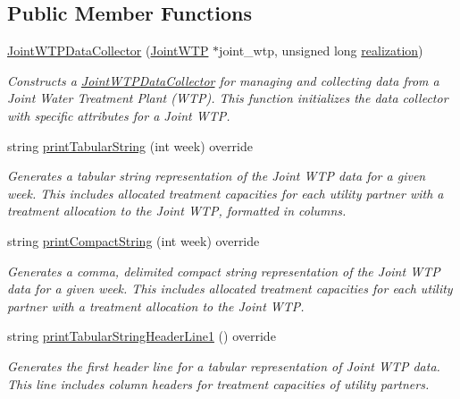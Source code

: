 \subsection*{Public Member Functions}
\begin{DoxyCompactItemize}
\item 
\mbox{\hyperlink{classJointWTPDataCollector_adcff7bd94e8f81a848b073d3a17c29ee}{Joint\+W\+T\+P\+Data\+Collector}} (\mbox{\hyperlink{classJointWTP}{Joint\+W\+TP}} $\ast$joint\+\_\+wtp, unsigned long \mbox{\hyperlink{classDataCollector_a9ef2887466fe3123aa19ef956a219b96}{realization}})
\begin{DoxyCompactList}\small\item\em Constructs a \mbox{\hyperlink{classJointWTPDataCollector}{Joint\+W\+T\+P\+Data\+Collector}} for managing and collecting data from a Joint Water Treatment Plant (W\+TP). This function initializes the data collector with specific attributes for a Joint W\+TP. \end{DoxyCompactList}\item 
string \mbox{\hyperlink{classJointWTPDataCollector_a9159c0e5c58ceb8b9bf86f01b53ecdef}{print\+Tabular\+String}} (int week) override
\begin{DoxyCompactList}\small\item\em Generates a tabular string representation of the Joint W\+TP data for a given week. This includes allocated treatment capacities for each utility partner with a treatment allocation to the Joint W\+TP, formatted in columns. \end{DoxyCompactList}\item 
string \mbox{\hyperlink{classJointWTPDataCollector_aadb9fb969b265c72555bb5a7d3ed945d}{print\+Compact\+String}} (int week) override
\begin{DoxyCompactList}\small\item\em Generates a comma, delimited compact string representation of the Joint W\+TP data for a given week. This includes allocated treatment capacities for each utility partner with a treatment allocation to the Joint W\+TP. \end{DoxyCompactList}\item 
string \mbox{\hyperlink{classJointWTPDataCollector_a6b9ba2992f4a9c3a900ad675b8301d07}{print\+Tabular\+String\+Header\+Line1}} () override
\begin{DoxyCompactList}\small\item\em Generates the first header line for a tabular representation of Joint W\+TP data. This line includes column headers for treatment capacities of utility partners. \end{DoxyCompactList}\item 

\end{DoxyCompactItemize}
